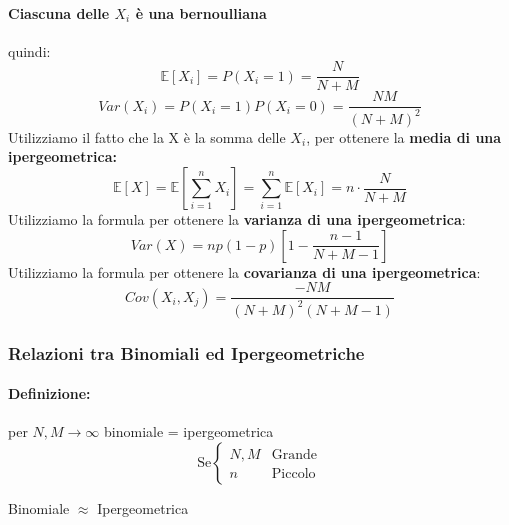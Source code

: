 \documentclass[]{article}
\newcommand{\ev}{\mathbb{E}[X]}
\renewcommand{\ev}[1]{\mathbb{E}[#1]}
\newcommand{\definizione}{\paragraph{Definizione:}}
\begin{document}
    \paragraph{Ciascuna delle $X_i$ è una bernoulliana} quindi:
    \[\ev{X_i} = P(X_i = 1) = \frac{N}{N + M}\]
    \[ Var(X_i) = P(X_i = 1) P(X_i = 0) = \frac{N M}{(N + M)^2}\]
    Utilizziamo il fatto che la X è la somma delle $X_i$, per ottenere la \textbf{media di una ipergeometrica:}
    \[ \ev{X} = \ev{\sum_{i = 1}^{n} X_i} = \sum_{i = 1}^{n} \ev{X_i} = n \cdot \frac{N}{N + M}\]
    Utilizziamo la formula per ottenere la \textbf{varianza di una ipergeometrica}:
    \[ Var(X) = np(1-p)[1 - \frac{n - 1}{N + M - 1}]\]
    Utilizziamo la formula per ottenere la \textbf{covarianza di una ipergeometrica}:
    \[ Cov(X_i, X_j) = \frac{-NM}{(N+M)^2 (N+M-1)} \]

    \subsubsection{Relazioni tra Binomiali ed Ipergeometriche}
    \definizione per $N, M \longrightarrow \infty$ binomiale = ipergeometrica
    \begin{equation*}
        \text{Se}
        \begin{cases}
            N, M & \text{Grande} \\
            n & \text{Piccolo}
        \end{cases}
    \end{equation*}
    \centerline{Binomiale $\approx$ Ipergeometrica}
\end{document}
